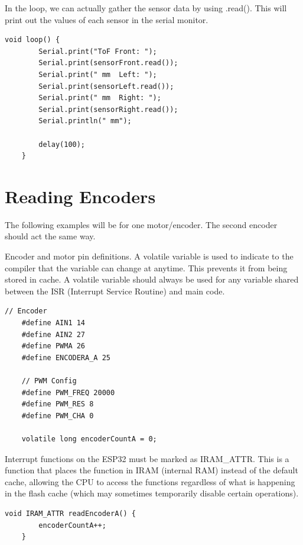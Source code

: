 \documentclass[11pt]{report}
\begin{document}
	\noindent
	In the loop, we can actually gather the sensor data by using .read(). This will print out the values of 
	each sensor in the serial monitor.
	\newline

	\begin{lstlisting}[style=arduino]
	void loop() {
		Serial.print("ToF Front: ");
		Serial.print(sensorFront.read());
		Serial.print(" mm  Left: ");
		Serial.print(sensorLeft.read());
		Serial.print(" mm  Right: ");
		Serial.print(sensorRight.read());
		Serial.println(" mm");

		delay(100);
	}
	\end{lstlisting}

	\newpage

    \section{Reading Encoders} \label{sec:reading_encoders}

	The following examples will be for one motor/encoder. The second encoder should act the same way. 

	\noindent
	Encoder and motor pin definitions. A volatile variable is used to indicate to the compiler that the variable
	can change at anytime. This prevents it from being stored in cache. A volatile variable should always be used 
	for any variable shared between the ISR (Interrupt Service Routine) and main code. 

	\begin{lstlisting}[style=arduino]
	// Encoder
	#define AIN1 14
	#define AIN2 27
	#define PWMA 26
	#define ENCODERA_A 25 

	// PWM Config
	#define PWM_FREQ 20000
	#define PWM_RES 8
	#define PWM_CHA 0

	volatile long encoderCountA = 0;
	\end{lstlisting}

	\noindent
	Interrupt functions on the ESP32 must be marked as IRAM\_ATTR. This is a function that places the function in IRAM
	(internal RAM) instead of the default cache, allowing the CPU to access the functions regardless of what is happening 
	in the flash cache (which may sometimes temporarily disable certain operations). 
   \newline

	\begin{lstlisting}[style=arduino]
	void IRAM_ATTR readEncoderA() {
		encoderCountA++;
	}
	\end{lstlisting}
\end{document}
